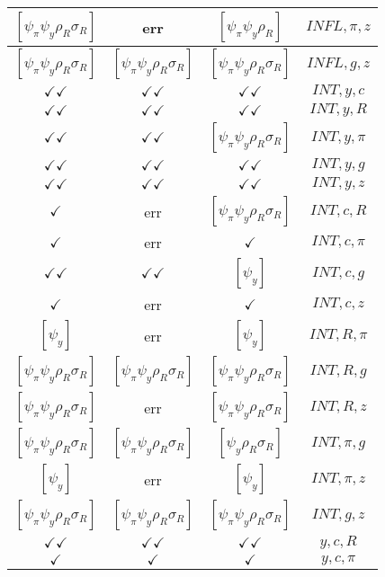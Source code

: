 \documentclass[a4paper,10pt]{article}
\begin{document}
\begin{longtable}{|c|c|c|c|}
\hline
$[\psi_\pi \psi_y \rho_R \sigma_R ]$ & err & $[\psi_\pi \psi_y \rho_R ]$ & ${INFL},{\pi},{z}$ \\
\hline
$[\psi_\pi \psi_y \rho_R \sigma_R ]$ & $[\psi_\pi \psi_y \rho_R \sigma_R ]$ & $[\psi_\pi \psi_y \rho_R \sigma_R ]$ & ${INFL},{g},{z}$ \\
\hline
$\checkmark\checkmark$ & $\checkmark\checkmark$ & $\checkmark\checkmark$ & ${INT},{y},{c}$ \\
\hline
$\checkmark\checkmark$ & $\checkmark\checkmark$ & $\checkmark\checkmark$ & ${INT},{y},{R}$ \\
\hline
$\checkmark\checkmark$ & $\checkmark\checkmark$ & $[\psi_\pi \psi_y \rho_R \sigma_R ]$ & ${INT},{y},{\pi}$ \\
\hline
$\checkmark\checkmark$ & $\checkmark\checkmark$ & $\checkmark\checkmark$ & ${INT},{y},{g}$ \\
\hline
$\checkmark\checkmark$ & $\checkmark\checkmark$ & $\checkmark\checkmark$ & ${INT},{y},{z}$ \\
\hline
$\checkmark$ & err & $[\psi_\pi \psi_y \rho_R \sigma_R ]$ & ${INT},{c},{R}$ \\
\hline
$\checkmark$ & err & $\checkmark$ & ${INT},{c},{\pi}$ \\
\hline
$\checkmark\checkmark$ & $\checkmark\checkmark$ & $[\psi_y ]$ & ${INT},{c},{g}$ \\
\hline
$\checkmark$ & err & $\checkmark$ & ${INT},{c},{z}$ \\
\hline
$[\psi_y ]$ & err & $[\psi_y ]$ & ${INT},{R},{\pi}$ \\
\hline
$[\psi_\pi \psi_y \rho_R \sigma_R ]$ & $[\psi_\pi \psi_y \rho_R \sigma_R ]$ & $[\psi_\pi \psi_y \rho_R \sigma_R ]$ & ${INT},{R},{g}$ \\
\hline
$[\psi_\pi \psi_y \rho_R \sigma_R ]$ & err & $[\psi_\pi \psi_y \rho_R \sigma_R ]$ & ${INT},{R},{z}$ \\
\hline
$[\psi_\pi \psi_y \rho_R \sigma_R ]$ & $[\psi_\pi \psi_y \rho_R \sigma_R ]$ & $[\psi_y \rho_R \sigma_R ]$ & ${INT},{\pi},{g}$ \\
\hline
$[\psi_y ]$ & err & $[\psi_y ]$ & ${INT},{\pi},{z}$ \\
\hline
$[\psi_\pi \psi_y \rho_R \sigma_R ]$ & $[\psi_\pi \psi_y \rho_R \sigma_R ]$ & $[\psi_\pi \psi_y \rho_R \sigma_R ]$ & ${INT},{g},{z}$ \\
\hline
$\checkmark\checkmark$ & $\checkmark\checkmark$ & $\checkmark\checkmark$ & ${y},{c},{R}$ \\
\hline
$\checkmark$ & $\checkmark$ & $\checkmark$ & ${y},{c},{\pi}$ \\

\end{longtable}
\end{document}
